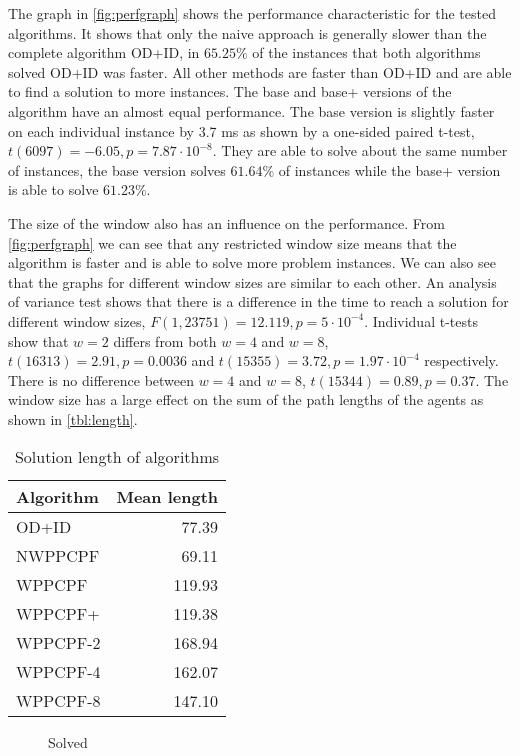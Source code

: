 The graph in \autoref{fig:perfgraph} shows the performance characteristic for
the tested algorithms. It shows that only the naive approach is generally
slower than the complete algorithm OD+ID, in $65.25\%$ of the instances that
both algorithms solved OD+ID was faster. All other methods are faster than
OD+ID and are able to find a solution to more instances. The base and base+
versions of the algorithm have an almost equal performance. The base version is
slightly faster on each individual instance by 3.7 ms as shown by a one-sided
paired t-test, $t(6097) = -6.05, p=7.87 \cdot 10^{-8}$. They are able to solve
about the same number of instances, the base version solves $61.64\%$ of
instances while the base+ version is able to solve $61.23\%$.

The size of the window also has an influence on the performance. From
\autoref{fig:perfgraph} we can see that any restricted window size means that
the algorithm is faster and is able to solve more problem instances. We can
also see that the graphs for different window sizes are similar to each other.
An analysis of variance test shows that there is a difference in the time to
reach a solution for different window sizes, $F(1, 23751) = 12.119, p=5\cdot
10^{-4}$. Individual t-tests show that $w=2$ differs from both $w=4$ and $w=8$,
$t(16313) = 2.91, p=0.0036$ and $t(15355)=3.72, p=1.97\cdot10^{-4}$
respectively. There is no difference between $w=4$ and $w=8$, $t(15344)=0.89,
p=0.37$. The window size has a large effect on the sum of the path lengths of
the agents as shown in \autoref{tbl:length}.

\begin{table}[t]
	\centering
	\caption{Solution length of algorithms}
	\label{tbl:length}
	\begin{tabular}{l|r}
		Algorithm & Mean length \\ \hline
		OD+ID & 77.39 \\
		NWPPCPF & 69.11 \\
		WPPCPF  & 119.93 \\
		WPPCPF+ & 119.38 \\
		WPPCPF-2 & 168.94  \\
		WPPCPF-4 & 162.07  \\
		WPPCPF-8 & 147.10
	\end{tabular}
\end{table}

\begin{figure}
	\centering
	
	\caption{Solved}
	\label{fig:solved}
\end{figure}

%	
